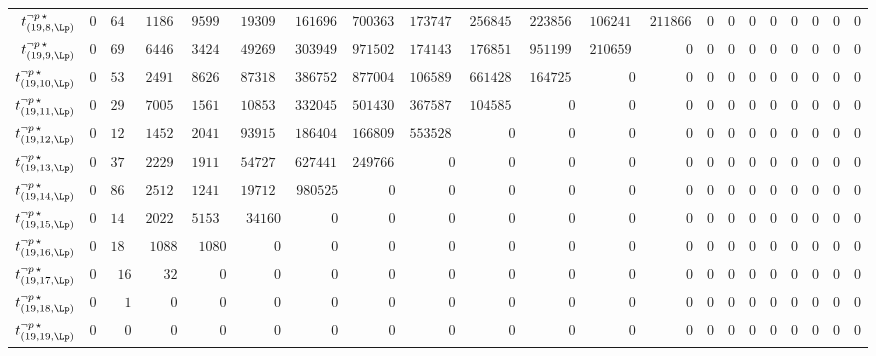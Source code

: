 \begin{tabular}{r|rrrrrrrrrrrrrrrrrrrr}
  $t^{\neg p \, \star}_{(19,8,\Lp)}$ & $0$ & $645829$ & $1186572882$ & $95995537773$ & $1930970572660$ & $16169622573780$ & $70036376562372$ & $173747134532132$ & $256845770054304$ & $223856478561051$ & $106241541289650$ & $21186613668330$ & $0$ & $0$ & $0$ & $0$ & $0$ & $0$ & $0$ & $0$ \\
  $t^{\neg p \, \star}_{(19,9,\Lp)}$ & $0$ & $695287$ & $644696906$ & $34246585596$ & $492694827672$ & $3039491379135$ & $9715020384798$ & $17414330164490$ & $17685107417184$ & $9511991622414$ & $2106593631100$ & $0$ & $0$ & $0$ & $0$ & $0$ & $0$ & $0$ & $0$ & $0$ \\
  $t^{\neg p \, \star}_{(19,10,\Lp)}$ & $0$ & $531197$ & $249136526$ & $8626097013$ & $87318322792$ & $386752374015$ & $877004041692$ & $1065896230819$ & $661428989360$ & $164725660125$ & $0$ & $0$ & $0$ & $0$ & $0$ & $0$ & $0$ & $0$ & $0$ & $0$ \\
  $t^{\neg p \, \star}_{(19,11,\Lp)}$ & $0$ & $295478$ & $70056032$ & $1561301745$ & $10853490532$ & $33204574855$ & $50143015050$ & $36758733564$ & $10458577536$ & $0$ & $0$ & $0$ & $0$ & $0$ & $0$ & $0$ & $0$ & $0$ & $0$ & $0$ \\
  $t^{\neg p \, \star}_{(19,12,\Lp)}$ & $0$ & $121750$ & $14527860$ & $204192477$ & $939159468$ & $1864045165$ & $1668099618$ & $553528206$ & $0$ & $0$ & $0$ & $0$ & $0$ & $0$ & $0$ & $0$ & $0$ & $0$ & $0$ & $0$ \\
  $t^{\neg p \, \star}_{(19,13,\Lp)}$ & $0$ & $37472$ & $2229968$ & $19119705$ & $54727100$ & $62744170$ & $24976692$ & $0$ & $0$ & $0$ & $0$ & $0$ & $0$ & $0$ & $0$ & $0$ & $0$ & $0$ & $0$ & $0$ \\
  $t^{\neg p \, \star}_{(19,14,\Lp)}$ & $0$ & $8631$ & $251290$ & $1241169$ & $1971256$ & $980525$ & $0$ & $0$ & $0$ & $0$ & $0$ & $0$ & $0$ & $0$ & $0$ & $0$ & $0$ & $0$ & $0$ & $0$ \\
  $t^{\neg p \, \star}_{(19,15,\Lp)}$ & $0$ & $1474$ & $20224$ & $51534$ & $34160$ & $0$ & $0$ & $0$ & $0$ & $0$ & $0$ & $0$ & $0$ & $0$ & $0$ & $0$ & $0$ & $0$ & $0$ & $0$ \\
  $t^{\neg p \, \star}_{(19,16,\Lp)}$ & $0$ & $184$ & $1088$ & $1080$ & $0$ & $0$ & $0$ & $0$ & $0$ & $0$ & $0$ & $0$ & $0$ & $0$ & $0$ & $0$ & $0$ & $0$ & $0$ & $0$ \\
  $t^{\neg p \, \star}_{(19,17,\Lp)}$ & $0$ & $16$ & $32$ & $0$ & $0$ & $0$ & $0$ & $0$ & $0$ & $0$ & $0$ & $0$ & $0$ & $0$ & $0$ & $0$ & $0$ & $0$ & $0$ & $0$ \\
  $t^{\neg p \, \star}_{(19,18,\Lp)}$ & $0$ & $1$ & $0$ & $0$ & $0$ & $0$ & $0$ & $0$ & $0$ & $0$ & $0$ & $0$ & $0$ & $0$ & $0$ & $0$ & $0$ & $0$ & $0$ & $0$ \\
  $t^{\neg p \, \star}_{(19,19,\Lp)}$ & $0$ & $0$ & $0$ & $0$ & $0$ & $0$ & $0$ & $0$ & $0$ & $0$ & $0$ & $0$ & $0$ & $0$ & $0$ & $0$ & $0$ & $0$ & $0$ & $0$ \\
\end{tabular}
